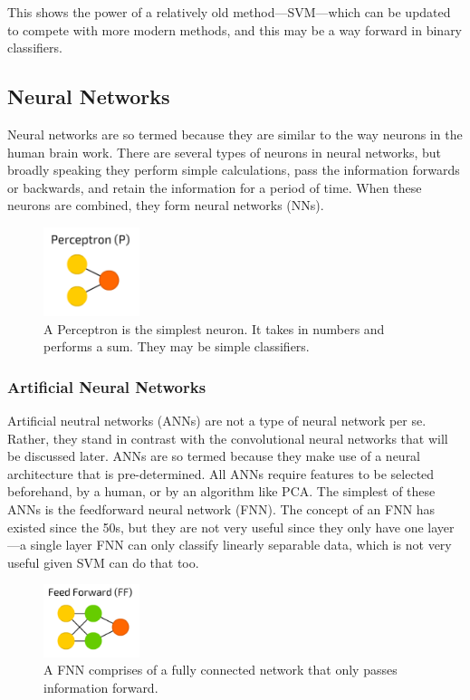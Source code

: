 \documentclass[a4paper,11pt]{article}
\begin{document}
This shows the power of a relatively old method—SVM—which can be updated to compete with more modern methods, and this may be a way forward in binary classifiers.

\subsection{Neural Networks}
Neural networks are so termed because they are similar to the way neurons in the human brain work. There are several types of neurons in neural networks, but broadly speaking they perform simple calculations, pass the information forwards or backwards, and retain the information for a period of time. When these neurons are combined, they form neural networks (NNs). 
\begin{figure}[ht]
\centering
\includegraphics[width=0.25\textwidth]{Perceptron.png}
\caption{\label{fig:Perceptron}A Perceptron is the simplest neuron. It takes in numbers and performs a sum. They may be simple classifiers. \cite{tch_2017_the}}
\end{figure}
\subsubsection{Artificial Neural Networks}
Artificial neutral networks (ANNs) are not a type of neural network per se. Rather, they stand in contrast with the convolutional neural networks that will be discussed later. ANNs are so termed because they make use of a neural architecture that is pre-determined. All ANNs require features to be selected beforehand, by a human, or by an algorithm like PCA. The simplest of these ANNs is the feedforward neural network (FNN). The concept of an FNN has existed since the 50s, but they are not very useful since they only have one layer—a single layer FNN can only classify linearly separable data, which is not very useful given SVM can do that too.
\begin{figure}[ht]
\centering
\includegraphics[width=0.25\textwidth]{FNN.png}
\caption{\label{fig:FNN}A FNN comprises of a fully connected network that only passes information forward. \cite{tch_2017_the}}
\end{figure}
\end{document}

